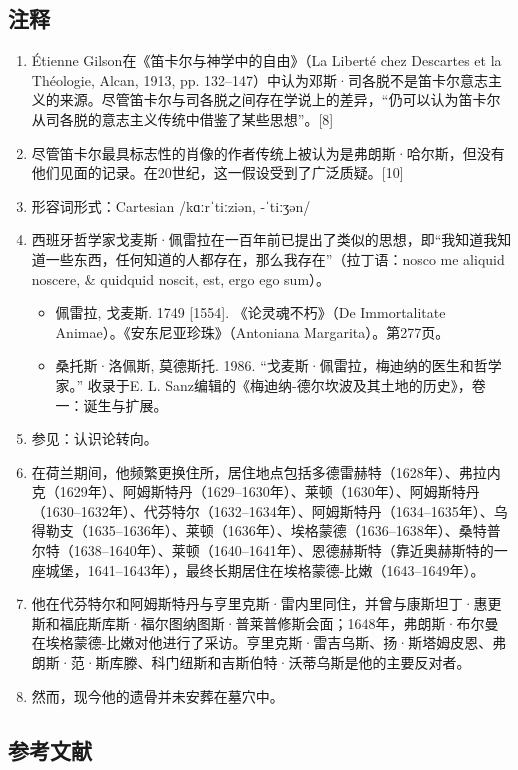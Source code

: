 \subsection{注释}
\begin{enumerate}
\item Étienne Gilson在《笛卡尔与神学中的自由》（La Liberté chez Descartes et la Théologie, Alcan, 1913, pp. 132–147）中认为邓斯·司各脱不是笛卡尔意志主义的来源。尽管笛卡尔与司各脱之间存在学说上的差异，“仍可以认为笛卡尔从司各脱的意志主义传统中借鉴了某些思想”。[8]
\item 尽管笛卡尔最具标志性的肖像的作者传统上被认为是弗朗斯·哈尔斯，但没有他们见面的记录。在20世纪，这一假设受到了广泛质疑。[10]
\item 形容词形式：Cartesian /kɑːrˈtiːziən, -ˈtiːʒən/
\item 西班牙哲学家戈麦斯·佩雷拉在一百年前已提出了类似的思想，即“我知道我知道一些东西，任何知道的人都存在，那么我存在”（拉丁语：nosco me aliquid noscere, & quidquid noscit, est, ergo ego sum）。
\begin{itemize}
\item  佩雷拉, 戈麦斯. 1749 [1554]. 《论灵魂不朽》（De Immortalitate Animae）。《安东尼亚珍珠》（Antoniana Margarita）。第277页。
\item  桑托斯·洛佩斯, 莫德斯托. 1986. “戈麦斯·佩雷拉，梅迪纳的医生和哲学家。” 收录于E. L. Sanz编辑的《梅迪纳-德尔坎波及其土地的历史》，卷一：诞生与扩展。
\end{itemize}
\item 参见：认识论转向。
\item 在荷兰期间，他频繁更换住所，居住地点包括多德雷赫特（1628年）、弗拉内克（1629年）、阿姆斯特丹（1629–1630年）、莱顿（1630年）、阿姆斯特丹（1630–1632年）、代芬特尔（1632–1634年）、阿姆斯特丹（1634–1635年）、乌得勒支（1635–1636年）、莱顿（1636年）、埃格蒙德（1636–1638年）、桑特普尔特（1638–1640年）、莱顿（1640–1641年）、恩德赫斯特（靠近奥赫斯特的一座城堡，1641–1643年），最终长期居住在埃格蒙德-比嫩（1643–1649年）。
\item 他在代芬特尔和阿姆斯特丹与亨里克斯·雷内里同住，并曾与康斯坦丁·惠更斯和福庇斯库斯·福尔图纳图斯·普莱普修斯会面；1648年，弗朗斯·布尔曼在埃格蒙德-比嫩对他进行了采访。亨里克斯·雷吉乌斯、扬·斯塔姆皮恩、弗朗斯·范·斯库滕、科门纽斯和吉斯伯特·沃蒂乌斯是他的主要反对者。
\item 然而，现今他的遗骨并未安葬在墓穴中。
\end{enumerate}
\subsection{参考文献}

